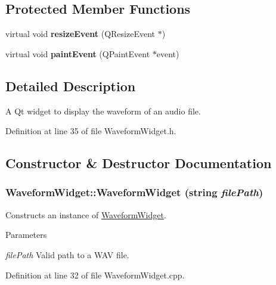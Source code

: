 \subsection*{Protected Member Functions}
\begin{DoxyCompactItemize}
\item 
\hypertarget{classWaveformWidget_aaaaf42b438d7f9d90631d90a78bb2867}{
virtual void {\bfseries resizeEvent} (QResizeEvent $\ast$)}
\label{classWaveformWidget_aaaaf42b438d7f9d90631d90a78bb2867}

\item 
\hypertarget{classWaveformWidget_a6837bf3108c2bcdcdc530c28cf0f0724}{
virtual void {\bfseries paintEvent} (QPaintEvent $\ast$event)}
\label{classWaveformWidget_a6837bf3108c2bcdcdc530c28cf0f0724}

\end{DoxyCompactItemize}


\subsection{Detailed Description}
A Qt widget to display the waveform of an audio file. 

Definition at line 35 of file WaveformWidget.h.

\subsection{Constructor \& Destructor Documentation}
\hypertarget{classWaveformWidget_a427abef421a28dd5b97536b3a890c754}{
\subsubsection[{WaveformWidget}]{\setlength{\rightskip}{0pt plus 5cm}WaveformWidget::WaveformWidget (string {\em filePath})}}
\label{classWaveformWidget_a427abef421a28dd5b97536b3a890c754}


Constructs an instance of \hyperlink{classWaveformWidget}{WaveformWidget}. 
\begin{DoxyParams}{Parameters}
\item[{\em filePath}]Valid path to a WAV file. \end{DoxyParams}


Definition at line 32 of file WaveformWidget.cpp.

